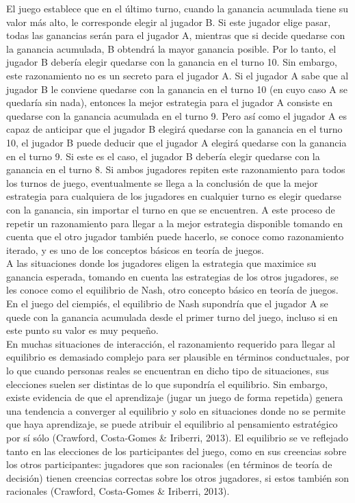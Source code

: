 El juego establece que en el último turno, cuando la ganancia acumulada tiene su valor más alto, le corresponde elegir al jugador B. Si este jugador elige pasar, todas las ganancias serán para el jugador A, mientras que si decide quedarse con la ganancia acumulada, B obtendrá la mayor ganancia posible. Por lo tanto, el jugador B debería elegir quedarse con la ganancia en el turno 10. Sin embargo, este razonamiento no es un secreto para el jugador A. Si el jugador A sabe que al jugador B le conviene quedarse con la ganancia en el turno 10 (en cuyo caso A se quedaría sin nada), entonces la mejor estrategia para el jugador A consiste en quedarse con la ganancia acumulada en el turno 9. Pero así como el jugador A es capaz de anticipar que el jugador B elegirá quedarse con la ganancia en el turno 10, el jugador B puede deducir que el jugador A elegirá quedarse con la ganancia en el turno 9. Si este es el caso, el jugador B debería elegir quedarse con la ganancia en el turno 8. Si ambos jugadores repiten este razonamiento para todos los turnos de juego, eventualmente se llega a la conclusión de que la mejor estrategia para cualquiera de los jugadores en cualquier turno es elegir quedarse con la ganancia, sin importar el turno en que se encuentren. A este proceso de repetir un razonamiento para llegar a la mejor estrategia disponible tomando en cuenta que el otro jugador también puede hacerlo, se conoce como razonamiento iterado, y es uno de los conceptos básicos en teoría de juegos.\\

A las situaciones donde los jugadores eligen la estrategia que maximice su ganancia esperada, tomando en cuenta las estrategias de los otros jugadores, se les conoce como el equilibrio de Nash, otro concepto básico en teoría de juegos. En el juego del ciempiés, el equilibrio de Nash supondría que el jugador A se quede con la ganancia acumulada desde el primer turno del juego, incluso si en este punto su valor es muy pequeño.\\

En muchas situaciones de interacción, el razonamiento requerido para llegar al equilibrio es demasiado complejo para ser plausible en términos conductuales, por lo que cuando personas reales se encuentran en dicho tipo de situaciones, sus elecciones suelen ser distintas de lo que supondría el equilibrio. Sin embargo, existe evidencia de que el aprendizaje (jugar un juego de forma repetida) genera una tendencia a converger al equilibrio y solo en situaciones donde no se permite que haya aprendizaje, se puede atribuir el equilibrio al pensamiento estratégico por sí sólo (Crawford, Costa-Gomes & Iriberri, 2013).
El equilibrio se ve reflejado tanto en las elecciones de los participantes del juego, como en sus creencias sobre los otros participantes: jugadores que son racionales (en términos de teoría de decisión) tienen creencias correctas sobre los otros jugadores, si estos también son racionales (Crawford, Costa-Gomes & Iriberri, 2013).\\

